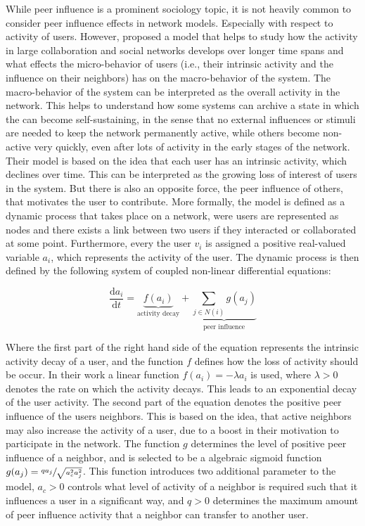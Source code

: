 While peer influence is a prominent sociology topic, it is not heavily common to consider peer influence effects in network models.
Especially with respect to activity of users.
However, \citet{Walk2016} proposed a model that helps to study how the activity in large collaboration and social networks develops over longer time spans and what effects the micro-behavior of users (i.e., their intrinsic activity and the influence on their neighbors) has on the macro-behavior of the system.
The macro-behavior of the system can be interpreted as the overall activity in the network.
This helps to understand how some systems can archive a state in which the can become self-sustaining, in the sense that no external influences or stimuli are needed to keep the network permanently active, while others become non-active very quickly, even after lots of activity in the early stages of the network.
Their model is based on the idea that each user has an intrinsic activity, which declines over time.
This can be interpreted as the growing loss of interest of users in the system.
But there is also an opposite force, the peer influence of others, that motivates the user to contribute.
More formally, the model is defined as a dynamic process that takes place on a network, were users are represented as nodes and there exists a link between two users if they interacted or collaborated at some point.
Furthermore, every the user \( v_{i} \) is assigned a positive real-valued variable \( a_{i} \), which represents the activity of the user.
The dynamic process is then defined by the following system of coupled non-linear differential equations:

\begin{equation}
    \frac{\mathrm{d} a_{i}}{\mathrm{d} t} =  \underbrace{f(a_{i})}_{\text{activity decay}} + \underbrace{\sum_{j \in N(i)} g(a_{j})}_{\text{peer influence}}
\end{equation}

Where the first part of the right hand side of the equation represents the intrinsic activity decay of a user, and the function \( f \) defines how the loss of activity should be occur.
In their work a linear function \( f(a_{i}) = -\lambda a_{i} \) is used, where \( \lambda > 0 \) denotes the rate on which the activity decays.
This leads to an exponential decay of the user activity.
The second part of the equation denotes the positive peer influence of the users neighbors.
This is based on the idea, that active neighbors may also increase the activity of a user, due to a boost in their motivation to participate in the network.
The function \( g \) determines the level of positive peer influence of a neighbor, and is selected to be a algebraic sigmoid function \( g(a_{j}) = \sfrac{q a_{j}}{\sqrt{a_{c}^{2} a_{j}^{2}}} \).
This function introduces two additional parameter to the model, \( a_{c} > 0 \) controls what level of activity of a neighbor is required such that it influences a user in a significant way, and \( q > 0 \) determines the maximum amount of peer influence activity that a neighbor can transfer to another user.

